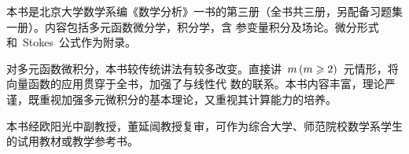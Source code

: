 

\begin{summary}
本书是北京大学数学系编《数学分析》一书的第三册（全书共三册，另配备习题集一册）。内容包括多元函数微分学，积分学，含
参变量积分及场论。微分形式和~Stokes~公式作为附录。

对多元函数微积分，本书较传统讲法有较多改变。直接讲~$m\mcond{m\geq2}$~元情形，将向量函数的应用贯穿于全书，加强了与线性代
数的联系。本书内容丰富，理论严谨，既重视加强多元微积分的基本理论，又重视其计算能力的培养。

本书经欧阳光中副教授，董延闿教授复审，可作为综合大学、师范院校数学系学生的试用教材或教学参考书。
\end{summary}

\MakeVolume*

\volfrontmatter



\VolumeTOC

\volmainmatter











\appendix


\endinput
